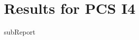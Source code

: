 \renewcommand{\DTRPcs}{I4} %
\renewcommand{\DTRPcsLong}{I4}


    \section{Results for PCS \DTRPcsLong}

    {{subReport}}
    \newpage

